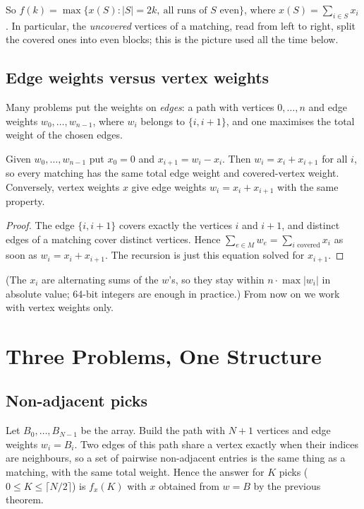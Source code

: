 \documentclass[11pt]{article}
\begin{document}
So $f(k)=\max\{x(S):|S|=2k,\ \text{all runs of }S\text{ even}\}$, where
$x(S)=\sum_{i\in S}x_i$. In particular, the \emph{uncovered} vertices
of a matching, read from left to right, split the covered ones into even
blocks; this is the picture used all the time below.

\subsection{Edge weights versus vertex weights}
Many problems put the weights on \emph{edges}: a path with vertices
$0,\dots,n$ and edge weights $w_0,\dots,w_{n-1}$, where $w_i$ belongs to
$\{i,i+1\}$, and one maximises the total weight of the chosen edges.

\begin{theorembox}
Given $w_0,\dots,w_{n-1}$ put $x_0=0$ and $x_{i+1}=w_i-x_i$. Then
$w_i=x_i+x_{i+1}$ for all $i$, so every matching has the same total
edge weight and covered-vertex weight. Conversely, vertex weights $x$
give edge weights $w_i=x_i+x_{i+1}$ with the same property.
\end{theorembox}
\begin{proof}
The edge $\{i,i+1\}$ covers exactly the vertices $i$ and $i+1$, and
distinct edges of a matching cover distinct vertices. Hence
$\sum_{e\in M}w_e=\sum_{i\text{ covered}}x_i$ as soon as
$w_i=x_i+x_{i+1}$. The recursion is just this equation solved for
$x_{i+1}$.
\end{proof}
(The $x_i$ are alternating sums of the $w$'s, so they stay within
$n\cdot\max|w_i|$ in absolute value; 64-bit integers are enough in
practice.) From now on we work with vertex weights only.

\section{Three Problems, One Structure}\label{sec:reductions}
\subsection{Non-adjacent picks}
Let $B_0,\dots,B_{N-1}$ be the array. Build the path with $N+1$ vertices and
edge weights $w_i=B_i$. Two edges of this path share a vertex exactly
when their indices are neighbours, so a set of pairwise non-adjacent
entries is the same thing as a matching, with the same total weight.
Hence the answer for $K$ picks ($0\le K\le\lceil N/2\rceil$) is $f_x(K)$ with
$x$ obtained from $w=B$ by the previous theorem.
\end{document}
